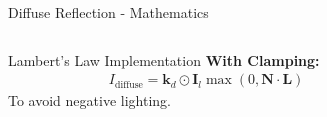 \begin{frame}{Diffuse Reflection - Mathematics}
\begin{columns}
\begin{column}{0.6\textwidth}
\begin{mathbox}{Lambert's Law Implementation}
        \pause
        \textbf{With Clamping:}
        \begin{align*}
          I_{\text{diffuse}} = \mathbf{k}_d \odot \mathbf{I}_l \max (0, \mathbf{N} \cdot \mathbf{L})
        \end{align*}
        To avoid negative lighting.
      \end{mathbox}
    \end{column}
    \begin{column}{0.4\textwidth}
    \end{column}
  \end{columns}
\end{frame}
